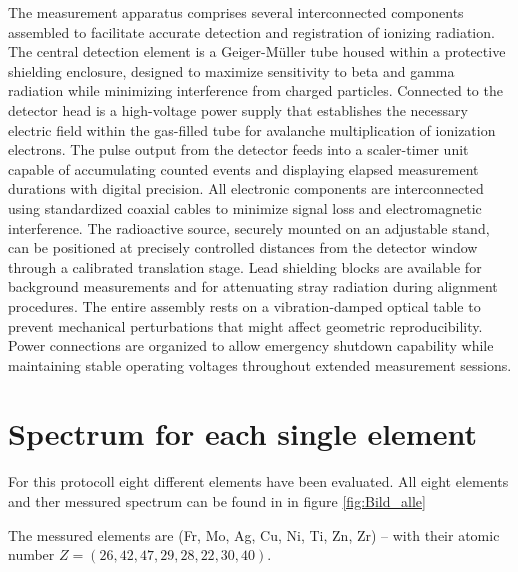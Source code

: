 The measurement apparatus comprises several interconnected components assembled to facilitate accurate detection and registration of ionizing radiation. The central detection element is a Geiger-Müller tube housed within a protective shielding enclosure, designed to maximize sensitivity to beta and gamma radiation while minimizing interference from charged particles. Connected to the detector head is a high-voltage power supply that establishes the necessary electric field within the gas-filled tube for avalanche multiplication of ionization electrons. The pulse output from the detector feeds into a scaler-timer unit capable of accumulating counted events and displaying elapsed measurement durations with digital precision. All electronic components are interconnected using standardized coaxial cables to minimize signal loss and electromagnetic interference. The radioactive source, securely mounted on an adjustable stand, can be positioned at precisely controlled distances from the detector window through a calibrated translation stage. Lead shielding blocks are available for background measurements and for attenuating stray radiation during alignment procedures. The entire assembly rests on a vibration-damped optical table to prevent mechanical perturbations that might affect geometric reproducibility. Power connections are organized to allow emergency shutdown capability while maintaining stable operating voltages throughout extended measurement sessions.


\section{Spectrum for each single element}
For this protocoll eight different elements have been evaluated. All eight elements and ther messured spectrum can be found in in figure \ref{fig:Bild_alle}

The messured elements are (Fr, Mo, Ag, Cu, Ni, Ti, Zn, Zr) -- with their atomic number $Z = (26, 42, 47, 29, 28, 22, 30, 40)$.
